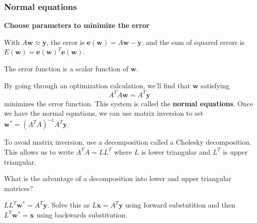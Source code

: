 \documentclass[12pt,letterpaper,noanswers]{exam}
\newcommand{\vc}[1]{\boldsymbol{#1}}
\begin{document}
\subsubsection{Normal equations}
\noindent\textbf{Choose parameters to minimize the error}
\begin{tcolorbox}
 With $A\vc{w} \approx \vc{y}$, the error is $\vc{e}(\vc{w}) = A\vc{w}-\vc{y}$, and the sum of squared errors is $E(\vc{w}) = \vc{e}(\vc{w})^T\vc{e}(\vc{w})$.
    
    The error function is a scalar function of $\vc{w}$.
    
    By going through an optimization calculation, we'll find that $\vc{w}$ satisfying \[A^TA\vc{w} = A^T\vc{y}\] minimizes the error function.  This system is called the \textbf{normal equations}.  Once we have the normal equations, we can use matrix inversion to set $\vc{w}^* = (A^TA)^{-1}A^T\vc{y}$.
\end{tcolorbox}



To avoid matrix inversion, use a decomposition called a Cholesky decomposition.  This allows us to write $A^TA = LL^T$ where $L$ is lower triangular and $L^T$ is upper triangular.  

What is the advantage of a decomposition into lower and upper triangular matrices?

$LL^T\vc{w}^* = A^T\vc{y}$. Solve this as $L\vc{x} = A^T\vc{y}$ using forward substutition and then $L^T\vc{w}^* = \vc{x}$ using backwards substitution.
\end{document}
